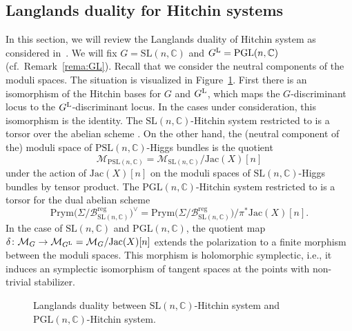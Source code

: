 \documentclass[pdftex]{sigma}
\numberwithin{equation}{section}
\theoremstyle{definition}
\newcommand{\reg}{\mathrm{reg}}
\newcommand{\Jac}{\mathrm{Jac}}
\renewcommand{\to}{\rightarrow}
\newcommand{\calB}{\mathcal{B}}
\newcommand{\calM}{\mathcal{M}}
\newcommand{\CC}{\mathbb{C}}
\newcommand{\Prym}{\mathrm{Prym}}
\newcommand{\SL}{\mathrm{SL}}
\newcommand{\PSL}{\mathrm{PSL}}
\newcommand{\PGL}{\mathrm{PGL}}
\begin{document}
\subsection{Langlands duality for Hitchin systems}
In this section, we will review the Langlands duality of Hitchin system as considered in~\cite{DonagiPantev}. We will fix $G=\SL(n,\CC)$ and $G^{\rm L}=\PGL(n,\CC)$ (cf.\ Remark~\ref{rema:GL}). Recall that we consider the neutral components of the moduli spaces. The situation is visualized in Figure~\ref{fig:Langlands}. First there is an isomorphism of the Hitchin bases for $G$ and $G^{\rm L}$, which maps the $G$-discriminant locus to the $G^{\rm L}$-discriminant locus. In the cases under consideration, this isomorphism is the identity. The $\SL(n,\CC)$-Hitchin system restricted to \smash{$\calB_{\SL(n,\CC)}^\reg$} is a torsor over the abelian scheme \smash{$\Prym(\Sigma/\calB^{\reg}_{\SL(n,\CC)})$}. On the other hand, the (neutral component of the) moduli space of $\PSL(n,\CC)$-Higgs bundles is the quotient
\[ \calM_{\PSL(n,\CC)} = \calM_{\SL(n,\CC)}/\Jac(X)[n]
\] under the action of $\Jac(X)[n]$ on the moduli spaces of $\SL(n,\CC)$-Higgs bundles by tensor product. The $\PGL(n,\CC)$-Hitchin system restricted to \smash{$\calB^\reg_{\PSL(n,\CC)}$} is a torsor for the dual abelian scheme
\[
\Prym\bigl(\Sigma/\calB^{\reg}_{\SL(n,\CC)}\bigr)^\vee=\Prym\bigl(\Sigma/\calB^{\reg}_{\SL(n,\CC)}\bigr)/\pi^*\Jac(X)[n].
\] In the case of $\SL(n,\CC)$ and $\PGL(n,\CC)$, the quotient map $\delta\colon \calM_G \to \calM_{G^{\rm L}}=\calM_G/\Jac(X)[n]$ extends the polarization to a finite morphism between the moduli spaces. This morphism is holomorphic symplectic, i.e., it induces an symplectic isomorphism of tangent spaces at the points with non-trivial stabilizer.
\begin{figure}[t]
 \centering

 \vspace{-2mm}

 \caption{Langlands duality between $\SL(n,\CC)$-Hitchin system and $\PGL(n,\CC)$-Hitchin system.}\label{fig:Langlands}
\end{figure}
\end{document}
